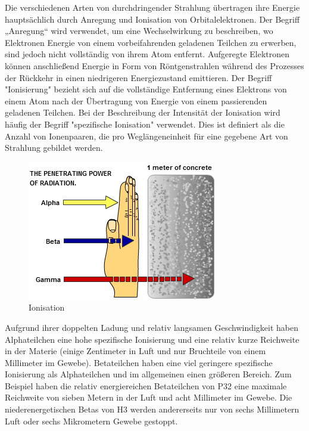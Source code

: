 Die verschiedenen Arten von durchdringender Strahlung übertragen ihre Energie hauptsächlich durch Anregung und Ionisation von Orbitalelektronen. Der Begriff „Anregung“ wird verwendet, um eine Wechselwirkung zu beschreiben, wo Elektronen Energie von einem vorbeifahrenden geladenen Teilchen zu erwerben, sind jedoch nicht vollständig von ihrem Atom entfernt. Aufgeregte Elektronen können anschließend Energie in Form von Röntgenstrahlen während des Prozesses der Rückkehr in einen niedrigeren Energiezustand emittieren. Der Begriff "Ionisierung" bezieht sich auf die vollständige Entfernung eines Elektrons von einem Atom nach der Übertragung von Energie von einem passierenden geladenen Teilchen. Bei der Beschreibung der Intensität der Ionisation wird häufig der Begriff "spezifische Ionisation" verwendet. Dies ist definiert als die Anzahl von Ionenpaaren, die pro Weglängeneinheit für eine gegebene Art von Strahlung gebildet werden.
\begin{figure}[htb]
  \centering  
  \includegraphics[scale=0.5]{img/Ionisation.png}
  \caption{Ionisation}
  \label{fig:Ionisation}
\end{figure}
Aufgrund ihrer doppelten Ladung und relativ langsamen Geschwindigkeit haben Alphateilchen eine hohe spezifische Ionisierung und eine relativ kurze Reichweite in der Materie (einige Zentimeter in Luft und nur Bruchteile von einem Millimeter im Gewebe). Betateilchen haben eine viel geringere spezifische Ionisierung als Alphateilchen und im allgemeinen einen größeren Bereich. Zum Beispiel haben die relativ energiereichen Betateilchen von P32 eine maximale Reichweite von sieben Metern in der Luft und acht Millimeter im Gewebe. Die niederenergetischen Betas von H3 werden andererseits nur von sechs Millimetern Luft oder sechs Mikrometern Gewebe gestoppt.\\
